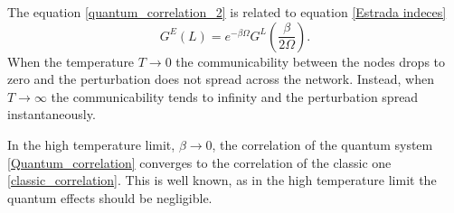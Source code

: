 The equation \eqref{quantum_correlation_2} is related to equation \eqref{Estrada indeces}
\begin{equation}
    G^E(L) = e^{-\beta\Omega}G^L\left(\frac{\beta}{2\Omega}\right).
\end{equation}
When the temperature $T \rightarrow 0$ the communicability between the nodes drops to zero and the perturbation does not spread across the network. Instead, when $T \rightarrow \infty$ the communicability tends to infinity and the perturbation spread instantaneously.  

In the high temperature limit, $\beta \rightarrow 0$, the correlation of the quantum system \eqref{Quantum_correlation} converges to the correlation of the classic one \eqref{classic_correlation}. This is well known, as in the high temperature limit the quantum effects should be negligible.
